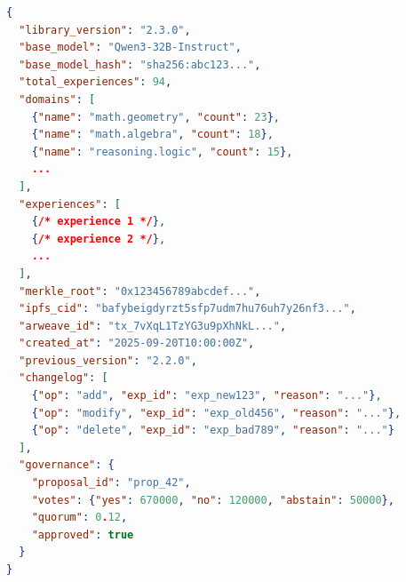 \begin{lstlisting}[language=json,caption=Experience Library JSON]
{
  "library_version": "2.3.0",
  "base_model": "Qwen3-32B-Instruct",
  "base_model_hash": "sha256:abc123...",
  "total_experiences": 94,
  "domains": [
    {"name": "math.geometry", "count": 23},
    {"name": "math.algebra", "count": 18},
    {"name": "reasoning.logic", "count": 15},
    ...
  ],
  "experiences": [
    {/* experience 1 */},
    {/* experience 2 */},
    ...
  ],
  "merkle_root": "0x123456789abcdef...",
  "ipfs_cid": "bafybeigdyrzt5sfp7udm7hu76uh7y26nf3...",
  "arweave_id": "tx_7vXqL1TzYG3u9pXhNkL...",
  "created_at": "2025-09-20T10:00:00Z",
  "previous_version": "2.2.0",
  "changelog": [
    {"op": "add", "exp_id": "exp_new123", "reason": "..."},
    {"op": "modify", "exp_id": "exp_old456", "reason": "..."},
    {"op": "delete", "exp_id": "exp_bad789", "reason": "..."}
  ],
  "governance": {
    "proposal_id": "prop_42",
    "votes": {"yes": 670000, "no": 120000, "abstain": 50000},
    "quorum": 0.12,
    "approved": true
  }
}
\end{lstlisting}

